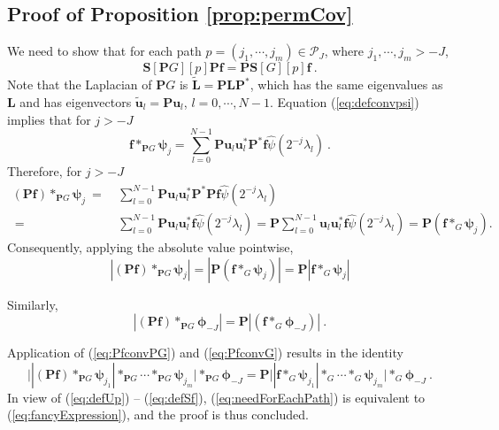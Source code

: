 \documentclass{article}
\def\l{\lambda}
\def\cP{\mathcal{P}}
\def\BL{\boldsymbol{L}}
\def\BP{\boldsymbol{P}}
\def\BS{\boldsymbol{S}}
\def\Bf{\boldsymbol{f}}
\def\Bu{\boldsymbol{u}}
\newcommand{\abs}[1]{\left| #1 \right|}
\begin{document}
\subsection{Proof of Proposition \ref{prop:permCov}}\label{subsec:proofpermcov}
We need to show that for each path $p = (j_1, \cdots, j_m) \in \cP_J$, where $j_1, \cdots, j_m > -J$, 
\begin{equation}\label{eq:needForEachPath}
\BS[\BP G] [p] \BP \Bf = \BP \BS [G] [p] \Bf ~.
\end{equation}
Note that the Laplacian of $\BP G$ is $\tilde{\BL} = \BP \BL \BP^*$, which has the same eigenvalues as $\BL$ and has eigenvectors $\tilde{\Bu}_l =  \BP \Bu_l$, $l = 0, \cdots, N-1$. Equation (\ref{eq:defconvpsi}) implies that for $j > -J$
\begin{equation}
\Bf \ast_{\BP G} \boldsymbol{\psi}_j = \sum_{l=0}^{N-1} \BP \Bu_l \Bu_l^* \BP^* \Bf \hat{\psi} (2^{-j} \l_l) ~.
\end{equation}
Therefore, for $j > -J$
\begin{equation}
\begin{aligned}
(\BP \Bf) \ast_{\BP G} \boldsymbol{\psi}_j ~=~ & \sum_{l=0}^{N-1} \BP \Bu_l \Bu_l^* \BP^* \BP \Bf \hat{\psi} (2^{-j} \l_l) \\
~=~ & \sum_{l=0}^{N-1} \BP \Bu_l \Bu_l^* \Bf \hat{\psi} (2^{-j} \l_l) = \BP \sum_{l=0}^{N-1}  \Bu_l \Bu_l^* \Bf \hat{\psi} (2^{-j} \l_l) = \BP (\Bf \ast_{G} \boldsymbol{\psi}_j).
\end{aligned}
\end{equation}
Consequently, applying the absolute value pointwise,
\begin{equation}\label{eq:PfconvPG}
\abs{(\BP \Bf) \ast_{\BP G} \boldsymbol{\psi}_j} = \abs{\BP (\Bf \ast_{G} \boldsymbol{\psi}_j)} = \BP \abs{\Bf \ast_G \boldsymbol{\psi}_j}
\end{equation}

Similarly,
\begin{equation}\label{eq:PfconvG}
\abs{(\BP \Bf) \ast_{\BP G} \boldsymbol{\phi}_{-J}} = \BP \abs{ (\Bf \ast_{G} \boldsymbol{\phi}_{-J}) } ~.
\end{equation}

Application of (\ref{eq:PfconvPG}) and (\ref{eq:PfconvG}) results in the identity
\begin{equation}\label{eq:fancyExpression}
\Big | \abs{(\BP \Bf) \ast_{\BP G} \boldsymbol{\psi}_{j_1}} \ast_{\BP G} \cdots \ast_{\BP G} \boldsymbol{\psi}_{j_m} \Big | \ast_{\BP G} \boldsymbol{\phi}_{-J} = \BP \Big | \abs{ \Bf \ast_{G} \boldsymbol{\psi}_{j_1}} \ast_{G} \cdots \ast_{G} \boldsymbol{\psi}_{j_m} \Big | \ast_{G} \boldsymbol{\phi}_{-J} ~.
\end{equation}
In view of (\ref{eq:defUp}) -- (\ref{eq:defSf}),  (\ref{eq:needForEachPath}) is equivalent to (\ref{eq:fancyExpression}), and the proof is thus concluded.
\end{document}
